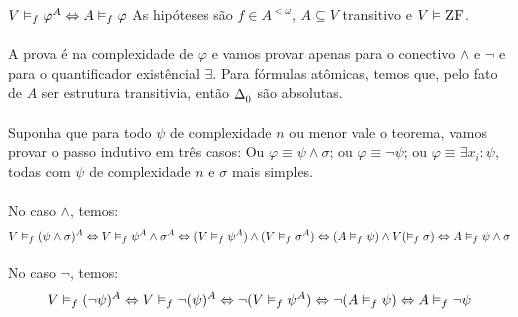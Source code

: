                 \begin{theorem}{$V\vDash_f\varphi^A\Leftrightarrow A\vDash_f\varphi$}
                    As hipóteses são $f\in A^{<\omega}$, $A\subseteq V$ transitivo e $V\vDash\text{\sc ZF}$.
                    \paragraph{}
                        A prova é na complexidade de $\varphi$ e vamos provar apenas para o conectivo $\land$ e $\neg$ e 
                        para o quantificador existêncial $\exists$. Para fórmulas atômicas, temos que, pelo fato de $A$ 
                        ser estrutura transitivia, então $\Delta^{}_{0}$ são absolutas.
                    \paragraph{}
                        Suponha que para todo $\psi$ de complexidade $n$ ou menor vale o teorema, vamos provar o passo 
                        indutivo em três casos: Ou $\varphi\equiv\psi\land\sigma$; ou $\varphi\equiv\neg\psi$; ou 
                        $\varphi\equiv\exists x_i: \psi$, todas com $\psi$ de complexidade $n$ e $\sigma$ mais simples.
                    \paragraph{}
                        No caso $\land$, temos:
                        $$ 
                             V\vDash_f (\psi\land\sigma)^A \Leftrightarrow 
                             V\vDash_f \psi^A\land\sigma^A \Leftrightarrow 
                            (V\vDash_f \psi^A)\land(V\vDash_f \sigma^A) \Leftrightarrow 
                            (A\vDash_f \psi)\land V(\vDash_f \sigma) \Leftrightarrow 
                             A\vDash_f \psi\land\sigma
                        $$
                    \paragraph{}
                        No caso $\neg$, temos:
                        $$ 
                            V\vDash_f (\neg\psi)^A \Leftrightarrow 
                            V\vDash_f \neg(\psi)^A \Leftrightarrow 
                            \neg(V\vDash_f \psi^A) \Leftrightarrow 
                            \neg(A\vDash_f \psi  ) \Leftrightarrow 
                            A\vDash_f \neg\psi
                        $$

\end{theorem}

